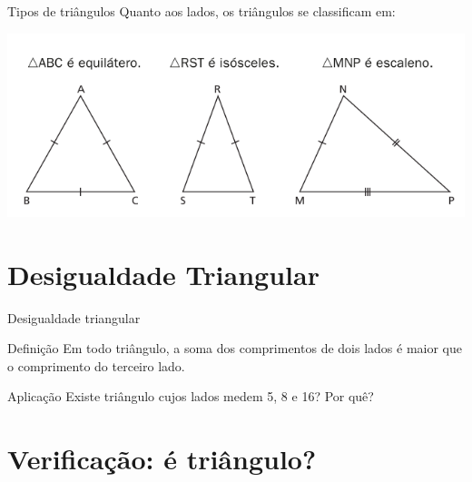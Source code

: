 \documentclass[12pt]{beamer}
\begin{document}
    \begin{frame}{Tipos de triângulos}
        Quanto aos lados, os triângulos se classificam em:

        \begin{center}
            \includegraphics[scale=0.5]{imagens/triangulos.png}
        \end{center}
    \end{frame}
\section{Desigualdade Triangular}

    \begin{frame}{Desigualdade triangular}
        \begin{alertblock}{Definição}
        \justifying
            Em todo triângulo, a soma dos comprimentos de dois lados é maior que o comprimento do terceiro lado. 
        \end{alertblock}
        
        \pause
        
        \begin{block}{Aplicação}
            Existe triângulo cujos lados medem 5, 8 e 16? Por quê?
        \end{block}

    \end{frame}
    
\section{Verificação: é triângulo?}
\end{document}
